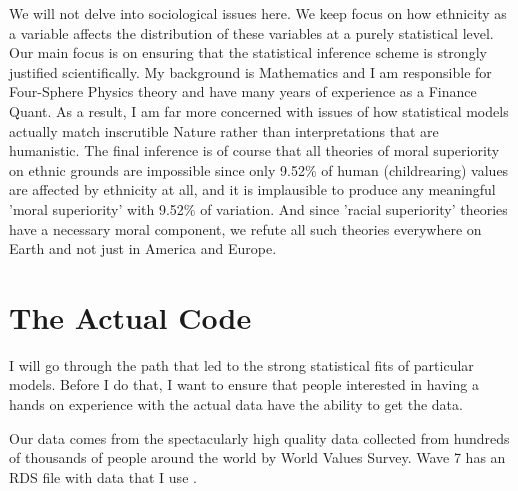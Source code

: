 \documentclass{amsart}
\begin{document}
We will not delve into sociological issues here.  We keep focus on how ethnicity as a variable affects the distribution of these variables at a purely statistical level.  Our main focus is on ensuring that the statistical inference scheme is strongly justified scientifically.  My background is Mathematics and I am responsible for Four-Sphere Physics theory and have many years of experience as a Finance Quant.  As a result, I am far more concerned with issues of how statistical models actually match inscrutible Nature rather than interpretations that are humanistic.  The final inference is of course that all theories of moral superiority on ethnic grounds are impossible since only 9.52\% of human (childrearing) values are affected by ethnicity at all, and it is implausible to produce any meaningful 'moral superiority' with 9.52\% of variation.  And since 'racial superiority' theories have a necessary moral component, we refute all such theories everywhere on Earth and not just in America and Europe.

\section{The Actual Code}

I will go through the path that led to the strong statistical fits of particular models.  Before I do that, I want to ensure that people interested in having a hands on experience with the actual data have the ability to get the data.  

Our data comes from the spectacularly high quality data collected from hundreds of thousands of people around the world by World Values Survey. Wave 7 has an RDS file with data that I use \cite{WVS}.
\end{document}
